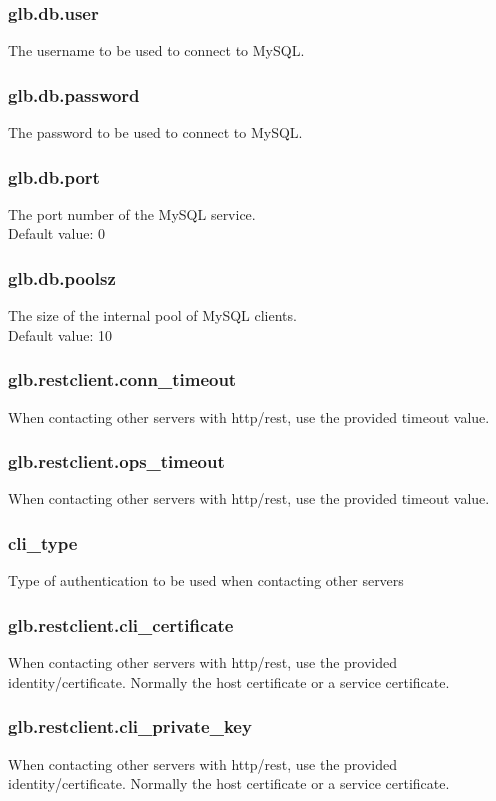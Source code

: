 \documentclass[a4paper,10pt]{scrreprt}
\begin{document}
\subsubsection{glb.db.user}
The username to be used to connect to MySQL.\\

\subsubsection{glb.db.password}
The password to be used to connect to MySQL.\\

\subsubsection{glb.db.port}
The port number of the MySQL service.\\
Default value: 0\\

\subsubsection{glb.db.poolsz}
The size of the internal pool of MySQL clients.\\
Default value: 10\\

\subsubsection{glb.restclient.conn\_timeout}
When contacting other servers with http/rest, use the provided timeout value.
\subsubsection{glb.restclient.ops\_timeout}
When contacting other servers with http/rest, use the provided timeout value.
\subsubsection{cli\_type}
Type of authentication to be used when contacting other servers
\subsubsection{glb.restclient.cli\_certificate}
When contacting other servers with http/rest, use the provided identity/certificate. Normally the host certificate or a service certificate.
\subsubsection{glb.restclient.cli\_private\_key}
When contacting other servers with http/rest, use the provided identity/certificate. Normally the host certificate or a service certificate.
\end{document}
